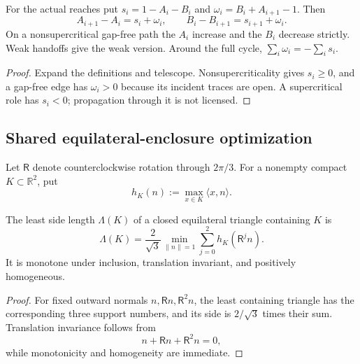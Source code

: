 \begin{lemma}
\label{lem:boundary-deficit-identities}
For the actual reaches put $s_i=1-A_i-B_i$ and
$\omega_i=B_i+A_{i+1}-1$. Then
\[
 A_{i+1}-A_i=s_i+\omega_i,\qquad
 B_i-B_{i+1}=s_{i+1}+\omega_i.
\]
On a nonsupercritical gap-free path the $A_i$ increase and the $B_i$
decrease strictly. Weak handoffs give the weak version. Around the full
cycle, $\sum_i\omega_i=-\sum_i s_i$.
\end{lemma}
\begin{proof}
Expand the definitions and telescope. Nonsupercriticality gives $s_i\ge0$,
and a gap-free edge has $\omega_i>0$ because its incident traces are open.
A supercritical role has $s_i<0$; propagation through it is not licensed.
\end{proof}

\subsection{Shared equilateral-enclosure optimization}
\label{sec:universal-calculus}

Let $\mathsf R$ denote counterclockwise rotation through $2\pi/3$.  For a
nonempty compact $K\subset\mathbb R^2$, put
\[
 h_K(n):=\max_{x\in K}\langle x,n\rangle.
\]

\begin{proposition}
\label{prop:new-enclosure-gauge}
\label{prop:universal-enclosure-gauge}
The least side length $\Lambda(K)$ of a closed equilateral triangle containing
$K$ is
\begin{equation}
 \Lambda(K)=\frac2{\sqrt3}
 \min_{\lVert n\rVert=1}\sum_{j=0}^2h_K(\mathsf R^jn).
 \label{eq:universal-lambda}
\end{equation}
It is monotone under inclusion, translation invariant, and positively
homogeneous.
\end{proposition}

\begin{proof}
For fixed outward normals $n,\mathsf Rn,\mathsf R^2n$, the least containing
triangle has the corresponding three support numbers, and its side is
$2/\sqrt3$ times their sum.  Translation invariance follows from
\[
 n+\mathsf Rn+\mathsf R^2n=0,
\]
while monotonicity and homogeneity are immediate.
\end{proof}

